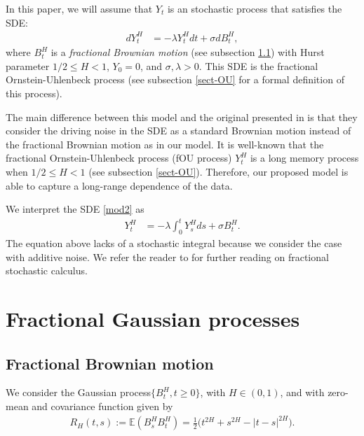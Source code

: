 \documentclass[smallextended]{svjour3}
\newcommand{\E}{\mathbb{E}}
\begin{document}
In this paper, we will assume that $Y_t$ is an stochastic process that satisfies the SDE:
\begin{align}
	dY_t^H&=-\lambda Y_t^Hdt+\sigma dB_t^H, \label{mod2}
\end{align}
where $B_t^H $ is a \emph{fractional Brownian motion} (see subsection \ref{fBm})
     with Hurst parameter $1/2 \le H< 1$,  $Y_0=0$, and
$\sigma,\lambda> 0$.
This SDE is the fractional Ornstein-Uhlenbeck process (see subsection \ref{sect-OU} for a formal definition of this process). 



The main difference between this model and the original presented
in \cite{mi-pr} is that they consider the driving noise in the SDE as a standard
Brownian motion instead of the fractional Brownian motion as in our model. It is well-known that the fractional Ornstein-Uhlenbeck process (fOU process) $ Y_t^H$ is a long memory process when $1/2 \le H< 1$ (see subsection \ref{sect-OU}). Therefore, our proposed model is able to capture a long-range dependence of the data.



We interpret the SDE \eqref{mod2} as
\begin{align}
	Y_t^H&=-\lambda\int_0^t Y_s^Hds+\sigma B_t^H.\label{mod3}
\end{align}
The equation above lacks of a stochastic integral because we
consider the case with additive noise.  We refer the reader to \cite{mi} for further reading on fractional stochastic calculus.


\section{Fractional Gaussian processes} \label{fgn}

\subsection{Fractional Brownian motion} \label{fBm}

        We consider the Gaussian process$\{B_t^H,t\ge 0\}$, with $H\in (0,1)$,
    and with zero-mean and covariance function given by
    \begin{align}
        R_H(t,s):=
            \E(
                B_s^H B_t^H
            )
            =
            \tfrac{1}{2}
            \big(
                t ^ {2 H} + s ^ {2 H}
                - |t - s| ^ {2 H}
            \big).\label{s1.1}
    \end{align}
\end{document}

